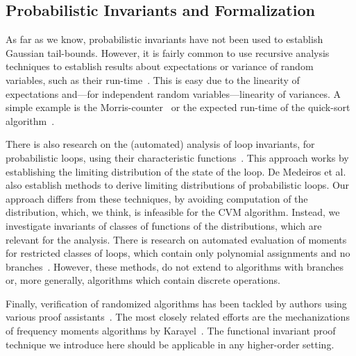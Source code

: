 \subsection{Probabilistic Invariants and Formalization}
As far as we know, probabilistic invariants have not been used to establish Gaussian tail-bounds.
However, it is fairly common to use recursive analysis techniques to establish results about expectations or variance of random variables, such as their run-time~\cite[Section 1.4]{motwani1995}.
This is easy due to the linearity of expectations and---for independent random variables---linearity of variances.
A simple example is the Morris-counter~\cite{morris1978} or the expected run-time of the quick-sort algorithm~\cite[Section 2.5]{mitzenmacher2005}.

There is also research on the (automated) analysis of loop invariants, for probabilistic loops, using their characteristic functions~\cite{batz2023, mciver2005}.
This approach works by establishing the limiting distribution of the state of the loop.
De Medeiros et al.~\cite[Section 3.2]{demedeiros2024} also establish methods to derive limiting distributions of probabilistic loops.
Our approach differs from these techniques, by avoiding computation of the distribution, which, we think, is infeasible for the CVM algorithm.
Instead, we investigate invariants of classes of functions of the distributions, which are relevant for the analysis.
There is research on automated evaluation of moments for restricted classes of loops, which contain only polynomial assignments and no branches~\cite{bartocci2019,kofnov2022}.
However, these methods, do not extend to algorithms with branches or, more generally, algorithms which contain discrete operations.

Finally, verification of randomized algorithms has been tackled by authors using various proof assistants~\cite{bosshard2024,demedeiros2024, eberl2020,gopinathan20,hurd03, Probabilistic_Prime_Tests-AFP, tan2024}.
The most closely related efforts are the mechanizations of frequency moments algorithms by Karayel~\cite{karayel2022, karayel2023}.
The functional invariant proof technique we introduce here should be applicable in any higher-order setting.
